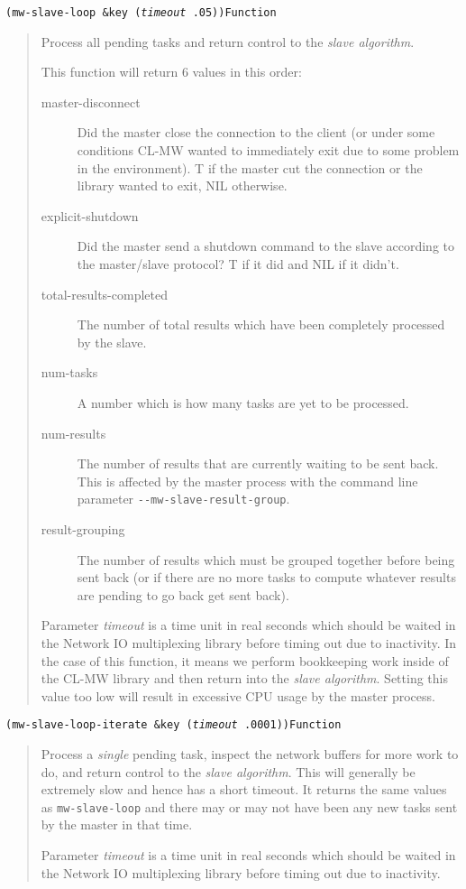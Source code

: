 \documentclass[titlepage,12pt]{book}
\newcommand{\xsmall}{\latexhtml{\small}{}}
\newcommand{\xnormalsize}{\latexhtml{\normalsize}{}}
\newcommand{\clmw}{\xsmall\textsc{CL-MW}\xnormalsize\xspace}
\newcommand{\sa}{\textit{slave algorithm}\xspace}
\newcommand{\dash}{\texttt{-}}
\newcommand{\func}[1]{\mbox{\texttt{#1}}\xspace}
\newcommand{\Option}[1]{\dash\dash\texttt{#1}}
\newcommand{\apifunc}[2]{\noindent\xsmall\texttt{(#1)}\hspace*{\fill}\xnormalsize\texttt{#2}}
\newenvironment{apientry}[2]
	{\apifunc{#1}{#2}\begin{quotation}}
	{\end{quotation}}
\begin{document}
\begin{apientry}
{mw-slave-loop \&key (\emph{timeout} .05)}
{Function}
Process all pending tasks and return control to the \sa.

This function will return 6 values in this order:
\begin{description}
\item[master-disconnect]
	Did the master close the connection to the client (or under some conditions
	\clmw wanted to immediately exit due to some problem in the environment).
	T if the master cut the connection or the library wanted to exit, NIL
	otherwise.
\item[explicit-shutdown]
	Did the master send a shutdown command to the slave according to the
	master/slave protocol?  T if it did and NIL if it didn't.
\item[total-results-completed]
	The number of total results which have been completely processed by the 
	slave.
\item[num-tasks]
	A number which is how many tasks are yet to be processed.
\item[num-results]
	The number of results that are currently waiting to be sent back. This is 
	affected by the master process with the command line parameter 
	\Option{mw-slave-result-group}.
\item[result-grouping]
	The number of results which must be grouped together before being sent
	back (or if there are no more tasks to compute whatever results are
	pending to go back get sent back).
\end{description}

Parameter \emph{timeout} is a time unit in real seconds which should
be waited in the Network IO multiplexing library before timing out
due to inactivity.  In the case of this function, it means we perform
bookkeeping work inside of the \clmw library and then return into
the \sa.  Setting this value too low will result in excessive CPU
usage by the master process.

\end{apientry}

\begin{apientry}
{mw-slave-loop-iterate \&key (\emph{timeout} .0001)}
{Function}
Process a \emph{single} pending task, inspect the network buffers for
more work to do, and return control to the \sa. This will generally
be extremely slow and hence has a short timeout. It returns the same values
as \func{mw-slave-loop} and there may or may not have been any new tasks
sent by the master in that time.

Parameter \emph{timeout} is a time unit in real seconds which should
be waited in the Network IO multiplexing library before timing out
due to inactivity.
\end{apientry}
\end{document}
